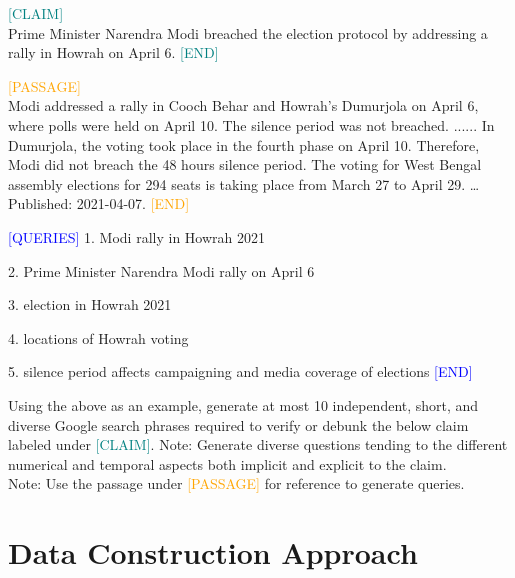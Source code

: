 \begin{tcolorbox}[title= \name{}s Prompt]
\small
\textcolor{teal}{[CLAIM]} \\
Prime Minister Narendra Modi breached the election protocol by addressing a rally in Howrah on April 6.
\textcolor{teal}{[END]}

\textcolor{orange}{[PASSAGE]}\\
Modi addressed a rally in Cooch Behar and Howrah’s Dumurjola on April 6, where polls were held on April 10. The silence period was not breached. ...... In Dumurjola, the voting took place in the fourth phase on April 10. Therefore, Modi did not breach the 48 hours silence period. The voting for West Bengal assembly elections for 294 seats is taking place from March 27 to April 29. \dots\\
Published: 2021-04-07. 
\textcolor{orange}{[END]} 

\textcolor{blue}{[QUERIES]}
1. Modi rally in Howrah 2021

     2. Prime Minister Narendra Modi rally on April 6
     
      3. election in Howrah 2021
      
       4. locations of Howrah voting
        
         5. silence period affects campaigning and media coverage of elections
\textcolor{blue}{[END]}

Using the above as an example, generate at most 10 independent, short, and diverse Google search phrases required to verify or debunk the below claim labeled under \textcolor{teal}{[CLAIM]}.
Note: Generate diverse questions tending to the different numerical and temporal aspects both implicit and explicit to the claim.
\\ Note: Use the passage under \textcolor{orange}{[PASSAGE]} for reference to generate queries. 
\end{tcolorbox}
\label{example:prompt_agq} 
\section{Data Construction Approach}

